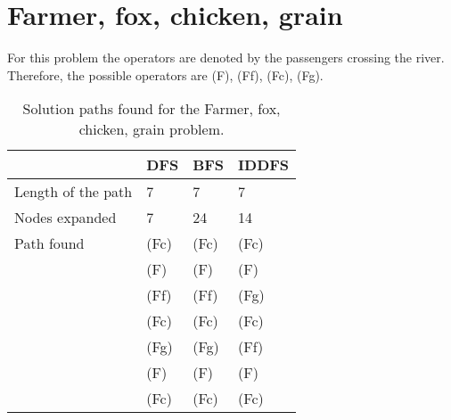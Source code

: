 \section{Farmer, fox, chicken, grain}

For this problem the operators are denoted by the passengers crossing the river.
Therefore, the possible operators are (F), (Ff), (Fc), (Fg).

\begin{table}[h]
\centering
\begin{tabular}{|l|l|l|l|}
\hline
					& DFS	& BFS	& IDDFS	\\
\hline
Length of the path	&  7	&  7	& 7 	\\
\hline
Nodes expanded		&  7	&  24	& 14	\\
\hline
Path found			& (Fc)	& (Fc)	& (Fc)	\\
					& (F)	& (F)	& (F)	\\
					& (Ff)	& (Ff)	& (Fg)	\\
					& (Fc)	& (Fc)	& (Fc)	\\
					& (Fg)	& (Fg)	& (Ff)	\\
					& (F)	& (F)	& (F)	\\
					& (Fc)	& (Fc)	& (Fc)	\\
\hline

\end{tabular}
\caption{Solution paths found for the Farmer, fox, chicken, grain problem.}
\end{table}